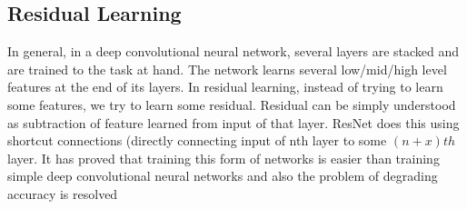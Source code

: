 \documentclass[12pt]{article}
\numberwithin{equation}{section}
\numberwithin{table}{section}
\numberwithin{figure}{section}
\begin{document}
\subsection{Residual Learning}

In general, in a deep convolutional neural network, several layers are stacked and are trained to the task at hand. The network learns several low/mid/high level features at the end of its layers. In residual learning, instead of trying to learn some features, we try to learn some residual. Residual can be simply understood as subtraction of feature learned from input of that layer. ResNet does this using shortcut connections (directly connecting input of nth layer to some $(n+x)th$ layer. It has proved that training this form of networks is easier than training simple deep convolutional neural networks and also the problem of degrading accuracy is resolved
\end{document}
